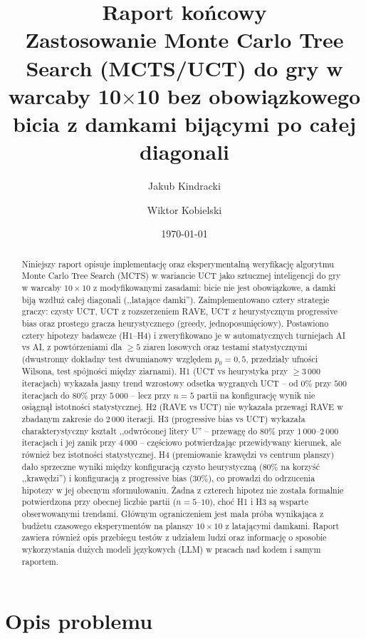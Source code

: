 \documentclass[11pt,a4paper]{article}
\title{Raport końcowy \\
\large Zastosowanie Monte Carlo Tree Search (MCTS/UCT) do gry w warcaby 10$\times$10 bez obowiązkowego bicia z damkami bijącymi po całej diagonali}
\author{Jakub Kindracki \and Wiktor Kobielski}
\date{\today}
\begin{document}
\maketitle

\begin{abstract}
Niniejszy raport opisuje implementację oraz eksperymentalną weryfikację
algorytmu Monte Carlo Tree Search (MCTS) w wariancie UCT jako sztucznej
inteligencji do gry w warcaby $10\times10$ z modyfikowanymi zasadami: bicie
nie jest obowiązkowe, a damki biją wzdłuż całej diagonali (,,latające
damki''). Zaimplementowano cztery strategie graczy: czysty UCT, UCT z
rozszerzeniem RAVE, UCT z heurystycznym progressive bias oraz prostego
gracza heurystycznego (greedy, jednoposunięciowy). Postawiono cztery
hipotezy badawcze (H1--H4) i zweryfikowano je w automatycznych turniejach
AI vs AI, z powtórzeniami dla $\geq 5$ ziaren losowych oraz testami
statystycznymi (dwustronny dokładny test dwumianowy względem $p_0=0{,}5$,
przedziały ufności Wilsona, test spójności między ziarnami). H1 (UCT vs
heurystyka przy $\geq 3\,000$ iteracjach) wykazała jasny trend wzrostowy
odsetka wygranych UCT -- od $0\%$ przy $500$ iteracjach do $80\%$ przy
$5\,000$ -- lecz przy $n=5$ partii na konfigurację wynik nie osiągnął
istotności statystycznej. H2 (RAVE vs UCT) nie wykazała przewagi RAVE w
zbadanym zakresie do $2\,000$ iteracji. H3 (progressive bias vs UCT)
wykazała charakterystyczny kształt ,,odwróconej litery U'' -- przewagę do
$80\%$ przy $1\,000$--$2\,000$ iteracjach i jej zanik przy $4\,000$ --
częściowo potwierdzając przewidywany kierunek, ale również bez istotności
statystycznej. H4 (premiowanie krawędzi vs centrum planszy) dało sprzeczne
wyniki między konfiguracją czysto heurystyczną ($80\%$ na korzyść
,,krawędzi'') i konfiguracją z progressive bias ($30\%$), co prowadzi do
odrzucenia hipotezy w jej obecnym sformułowaniu. Żadna z czterech hipotez
nie została formalnie potwierdzona przy obecnej liczbie partii
($n=5$--$10$), choć H1 i H3 są wsparte obserwowanymi trendami. Głównym
ograniczeniem jest mała próba wynikająca z budżetu czasowego eksperymentów
na planszy $10\times10$ z latającymi damkami. Raport zawiera również opis
przebiegu testów z udziałem ludzi oraz informację o sposobie wykorzystania
dużych modeli językowych (LLM) w pracach nad kodem i samym raportem.
\end{abstract}

\tableofcontents

\section{Opis problemu}
\label{sec:problem}
\end{document}
